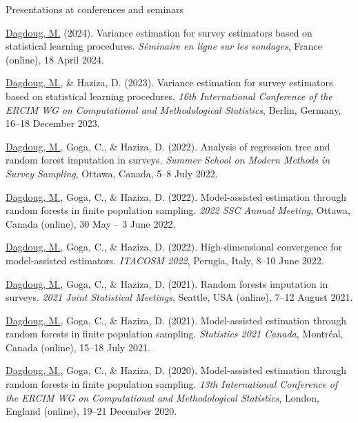 \documentclass{resume}
\begin{document}
\begin{rSection}{Presentations at conferences and seminars}
\begin{etaremune}
  \item \underline{Dagdoug, M.} (2024). Variance estimation for survey estimators based on statistical learning procedures. \textit{Séminaire en ligne sur les sondages}, France (online), 18 April 2024.
  \item \underline{Dagdoug, M.}, \& Haziza, D. (2023). Variance estimation for survey estimators based on statistical learning procedures. \textit{16th International Conference of the ERCIM WG on Computational and Methodological Statistics}, Berlin, Germany, 16--18 December 2023.
  \item \underline{Dagdoug, M.}, Goga, C., \& Haziza, D. (2022). Analysis of regression tree and random forest imputation in surveys. \textit{Summer School on Modern Methods in Survey Sampling}, Ottawa, Canada, 5--8 July 2022.
  \item \underline{Dagdoug, M.}, Goga, C., \& Haziza, D. (2022). Model-assisted estimation through random forests in finite population sampling. \textit{2022 SSC Annual Meeting}, Ottawa, Canada (online), 30 May -- 3 June 2022.
  \item \underline{Dagdoug, M.}, Goga, C., \& Haziza, D. (2022). High-dimensional convergence for model-assisted estimators. \textit{ITACOSM 2022}, Perugia, Italy, 8--10 June 2022.
  \item \underline{Dagdoug, M.}, Goga, C., \& Haziza, D. (2021). Random forests imputation in surveys. \textit{2021 Joint Statistical Meetings}, Seattle, USA (online), 7--12 August 2021.
  \item \underline{Dagdoug, M.}, Goga, C., \& Haziza, D. (2021). Model-assisted estimation through random forests in finite population sampling. \textit{Statistics 2021 Canada}, Montréal, Canada (online), 15--18 July 2021.
  \item \underline{Dagdoug, M.}, Goga, C., \& Haziza, D. (2020). Model-assisted estimation through random forests in finite population sampling. \textit{13th International Conference of the ERCIM WG on Computational and Methodological Statistics}, London, England (online), 19--21 December 2020.
\end{etaremune}

\vspace{1mm}\hrulefill\vspace{1mm}


\end{rSection}
\end{document}
